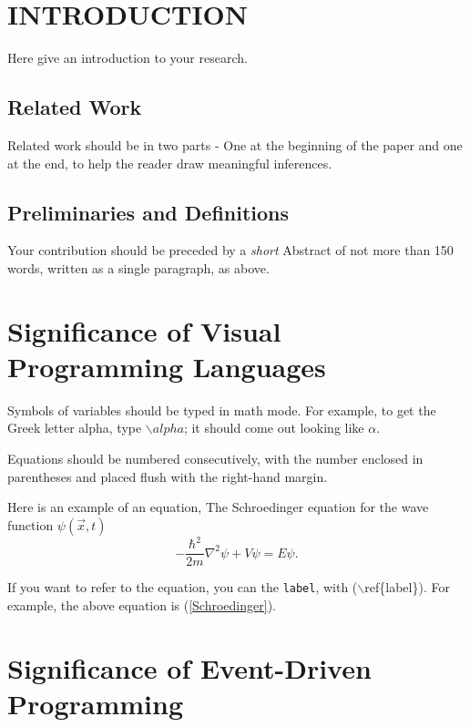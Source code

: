 \documentclass[aps,prb,twocolumn,superscriptaddress,floatfix,longbibliography]{revtex4-2}
\newcounter{para}
\begin{document}
\maketitle %

\tableofcontents

\section{INTRODUCTION}

Here give an introduction to your research.

\subsection{Related Work}

Related work should be in two parts - One at the beginning of the paper and one at the end, to help the reader draw meaningful inferences.
 
\subsection{Preliminaries and Definitions}

Your contribution should  be preceded by a {\it short} Abstract
of not more than 150 words,
written as a single paragraph, as above.

\section{Significance of Visual Programming Languages}

Symbols of variables should  be typed in math mode.
For example, to get the Greek letter alpha,
type $\backslash{alpha}$; it should come out looking
like $\alpha$.

Equations should be numbered consecutively, with the 
number enclosed in parentheses and placed flush with
the right-hand margin.

Here is an example of an equation, The Schroedinger
equation for the wave function $\psi(\vec{x},t)$
\begin{equation}\label{Schroedinger}
-\frac{\hbar^{2}}{2m}\nabla^{2}\psi+V\psi=E\psi.
\end{equation}

If you want to refer to the equation, you can
the {\tt label}, with ($\backslash$ref\{label\}).
For example, the above equation is (\ref{Schroedinger}).

\section{Significance of Event-Driven Programming}
\end{document}
